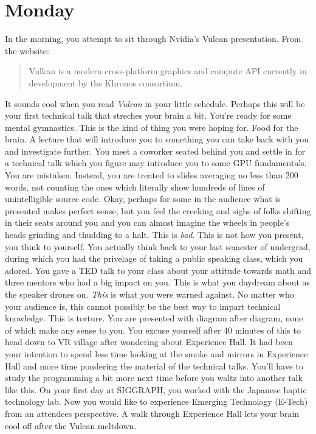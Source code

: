 \documentclass[../main.tex]{subfiles}
\begin{document}
\section{Monday}

In the morning, you attempt to sit through Nvidia's Vulcan presentation. From the website:

\begin{quote}
Vulkan is a modern cross-platform graphics and compute API currently in development by the Khronos consortium.
\end{quote}

It sounds cool when you read \textit{Vulcan} in your little schedule. Perhaps this will be your first technical talk that streches your brain a bit. You're ready for some mental gymnastics. This is the kind of thing you were hoping for. Food for the brain. A lecture that will introduce you to something you can take back with you and investigate further. You meet a coworker seated behind you and settle in for a technical talk which you figure may introduce you to some GPU fundamentals. You are mistaken. Instead, you are treated to slides averaging no less than 200 words, not counting the ones which literally show hundreds of lines of unintelligible source code. Okay, perhaps for some in the audience what is presented makes perfect sense, but you feel the creeking and sighs of folks shifting in their seats around you and you can almost imagine the wheels in people's heads grinding and thudding to a halt. This is \textit{bad}. This is not how you present, you think to yourself. You actually think back to your last semester of undergrad, during which you had the privelage of taking a public speaking class, which you adored. You gave a TED talk to your class about your attitude towards math and three mentors who had a big impact on you. This is what you daydream about as the speaker drones on. \textit{This} is what you were warned against. No matter who your audience is, this cannot possibly be the best way to impart technical knowledge. This is torture. You are presented with diagram after diagram, none of which make any sense to you. You excuse yourself after 40 minutes of this to head down to VR village after wondering about Experience Hall. It had been your intention to spend less time looking at the smoke and mirrors in Experience Hall and more time pondering the material of the technical talks. You'll have to study the programming a bit more next time before you waltz into another talk like this. On your first day at SIGGRAPH, you worked with the Japanese haptic technology lab. Now you would like to experience Emerging Technology (E-Tech) from an attendees perspective. A walk through Experience Hall lets your brain cool off after the Vulcan meltdown.
\end{document}
